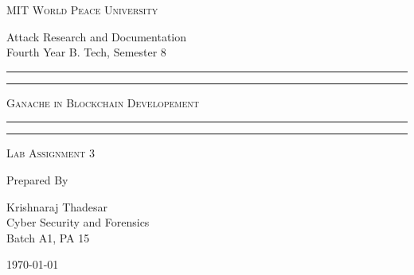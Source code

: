 \documentclass[11pt]{article}
\begin{document}
\begin{titlepage}
	\centering


	\huge\textsc{
		MIT World Peace University
	}\\

	\vspace{0.75\baselineskip} %

	\LARGE{
		Attack Research and Documentation\\
		Fourth Year B. Tech, Semester 8
	}

	\vfill %


	\rule{\textwidth}{1.6pt}\vspace*{-\baselineskip}\vspace*{2pt}
	\rule{\textwidth}{0.6pt}
	\vspace{0.75\baselineskip} %

	\huge{\textsc{
        Ganache in Blockchain Developement
    }} \\

	\vspace{0.5\baselineskip} %
	\rule{\textwidth}{0.6pt}\vspace*{-\baselineskip}\vspace*{2.8pt}
	\rule{\textwidth}{1.6pt}

	\vspace{1\baselineskip} %


	\LARGE\textsc{
		Lab Assignment 3
	} %
	\vfill


	Prepared By \vspace{0.5\baselineskip} %

	\Large{
		Krishnaraj Thadesar \\
		Cyber Security and Forensics\\
        Batch A1, PA 15
	}

	\vspace{0.5\baselineskip} %
	\today

\end{titlepage}
\end{document}
